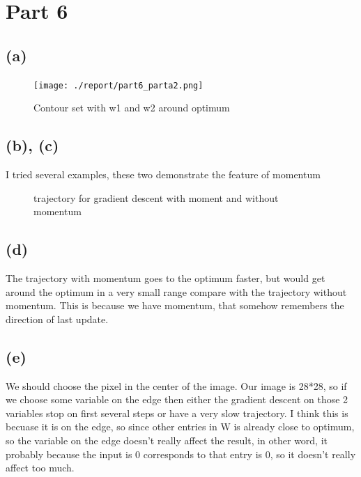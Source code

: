 \documentclass[12pt]{article}
\begin{document}
\section*{Part 6}
\subsection*{(a)}
\begin{figure}[H]
    \centering
    \texttt{[image: ./report/part6\_parta2.png]}
    \caption{Contour set with w1 and w2 around optimum}
\end{figure}

\subsection*{(b), (c)}
I tried several examples, these two demonstrate the feature of momentum
\begin{figure}[H]
    \qquad
    \caption{trajectory for gradient descent with moment and without momentum}
\end{figure}

\subsection*{(d)}
The trajectory with momentum goes to the optimum faster, but would get around the optimum in a very small range compare with the trajectory without momentum. This is because we have momentum, that somehow remembers the direction of last update.

\subsection*{(e)}
We should choose the pixel in the center of the image. Our image is 28*28, so if we choose some variable on the edge then either the gradient descent on those 2 variables stop on first several steps or have a very slow trajectory. I think this is becuase it is on the edge, so since other entries in W is already close to optimum, so the variable on the edge doesn't really affect the result, in other word, it probably because the input is 0 corresponds to that entry is 0, so it doesn't really affect too much.
\end{document}
